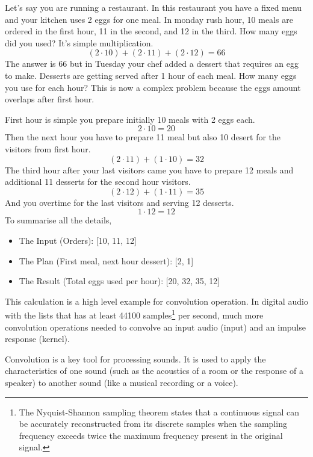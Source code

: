             Let's say you are running a restaurant. In this restaurant you have a fixed menu and your kitchen uses 2 eggs for one meal. In monday rush hour, 10 meals are ordered in the first hour, 11 in the second, and 12 in the third. How many eggs did you used? It's simple multiplication. 
            $$(2\cdot10)+(2\cdot11)+(2\cdot12)=66$$
            The answer is 66 but in Tuesday your chef added a dessert that requires an egg to make. Desserts are getting served after 1 hour of each meal. How many eggs you use for each hour? This is now a complex problem because the eggs amount overlaps after first hour.

            First hour is simple you prepare initially 10 meals with 2 eggs each. 
            $$2\cdot10=20$$
            Then the next hour you have to prepare 11 meal but also 10 desert for the visitors from first hour.
            $$(2\cdot11)+(1\cdot10)=32$$
            The third hour after your last visitors came you have to prepare 12 meals and additional 11 desserts for the second hour visitors.
            $$(2\cdot12)+(1\cdot11)=35$$
            And you overtime for the last visitors and serving 12 desserts.
            $$1\cdot12=12$$
            To summarise all the details,\par
            \begin{itemize}
                \item The Input (Orders): [10, 11, 12]
                \item The Plan (First meal, next hour dessert): [2, 1]
                \item The Result (Total eggs used per hour): [20, 32, 35, 12]
            \end{itemize}
            This calculation is a high level example for convolution operation. In digital audio with the lists that has at least 44100 samples\footnote{The Nyquist-Shannon sampling theorem states that a continuous signal can be accurately reconstructed from its discrete samples when the sampling frequency exceeds twice the maximum frequency present in the original signal\cite{Digital_Audio_Theory}.} per second, much more convolution operations needed to convolve an input audio (input) and an impulse response (kernel).\par

            Convolution is a key tool for processing sounds. It is used to apply the characteristics of one sound (such as the acoustics of a room or the response of a speaker) to another sound (like a musical recording or a voice).\par

